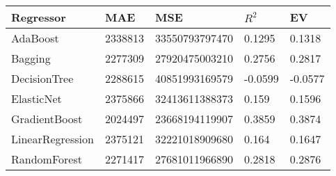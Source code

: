 \begin{tabular}{|p{3cm}p{1.5cm}p{2.5cm}p{1.2cm}p{1.2cm}|}
  \hline
Regressor & MAE & MSE & $R^2$ & EV \\ 
  \hline \hline
AdaBoost & 2338813 & 33550793797470 & 0.1295 & 0.1318 \\ 
  Bagging & 2277309 & 27920475003210 & 0.2756 & 0.2817 \\ 
  DecisionTree & 2288615 & 40851993169579 & -0.0599 & -0.0577 \\ 
  ElasticNet & 2375866 & 32413611388373 & 0.159 & 0.1596 \\ 
  GradientBoost & 2024497 & 23668194119907 & 0.3859 & 0.3874 \\ 
  LinearRegression & 2375121 & 32221018909680 & 0.164 & 0.1647 \\ 
  RandomForest & 2271417 & 27681011966890 & 0.2818 & 0.2876 \\ 
   \hline
\end{tabular}
